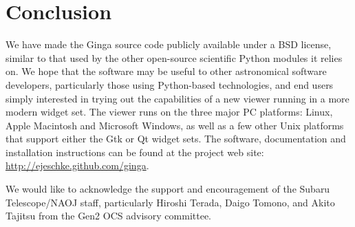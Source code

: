 \section{Conclusion}
We have made the Ginga source code publicly available under a BSD license, similar to that used by the other open-source scientific Python modules it relies on. We hope that the software may be useful to other astronomical software developers, particularly those using Python-based technologies, and end users simply interested in trying out the capabilities of a new viewer running in a more modern widget set.  The viewer runs on the three major PC platforms: Linux, Apple Macintosh and Microsoft Windows, as well as a few other Unix platforms that support either the Gtk or Qt widget sets. The software, documentation and installation instructions can be found at the project web site: \url{http://ejeschke.github.com/ginga}.

\acknowledgements We would like to acknowledge the support and encouragement of the Subaru Telescope/NAOJ staff, particularly Hiroshi Terada, Daigo Tomono, and Akito Tajitsu from the Gen2 OCS advisory committee. 


